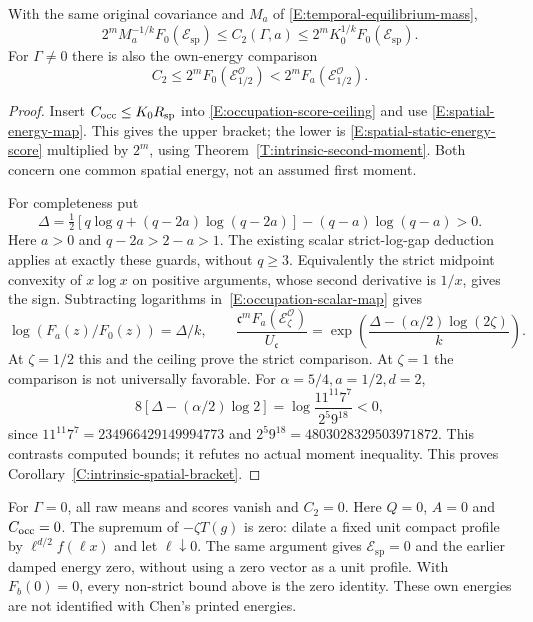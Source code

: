 \begin{corollary}
  \label{C:intrinsic-spatial-bracket}
  With the same original covariance and $M_a$ of
  \eqref{E:temporal-equilibrium-mass},
  \begin{equation}\label{E:intrinsic-spatial-bracket}
    2^m M_a^{-1/k}F_0(\mathcal E_{\mathrm{sp}})
    \le C_2(\Gamma,a)
    \le2^m K_0^{1/k}F_0(\mathcal E_{\mathrm{sp}}).
  \end{equation}
  For $\Gamma\ne0$ there is also the own-energy comparison
  \[
    C_2\le2^mF_0(\mathcal E_{1/2}^{\mathcal O})
    <2^mF_a(\mathcal E_{1/2}^{\mathcal O}).
  \]
\end{corollary}

\begin{proof}
  Insert $C_{\rm occ}\le K_0R_{\mathrm{sp}}$ into
  \eqref{E:occupation-score-ceiling} and use
  \eqref{E:spatial-energy-map}.
  This gives the upper bracket; the lower is
  \eqref{E:spatial-static-energy-score} multiplied by $2^m$,
  using Theorem~\ref{T:intrinsic-second-moment}.
  Both concern one common spatial energy, not an assumed first moment.

  For completeness put
  \[
    \Delta=\tfrac12[q\log q+(q-2a)\log(q-2a)]
    -(q-a)\log(q-a)>0.
  \]
  Here $a>0$ and $q-2a>2-a>1$.
  The existing scalar strict-log-gap deduction applies at exactly
  these guards, without $q\ge3$.
  Equivalently the strict midpoint convexity of $x\log x$ on
  positive arguments, whose second derivative is $1/x$, gives the sign.
  Subtracting logarithms in~\eqref{E:occupation-scalar-map} gives
  \[
    \log(F_a(z)/F_0(z))=\Delta/k,\qquad
    \frac{\mathfrak c^mF_a(\mathcal E_\zeta^{\mathcal O})}{U_{\mathfrak c}}
    =\exp\!\left(\frac{\Delta-(\alpha/2)\log(2\zeta)}{k}\right).
  \]
  At $\zeta=1/2$ this and the ceiling prove the strict comparison.
  At $\zeta=1$ the comparison is not universally favorable.
  For $\alpha=5/4,a=1/2,d=2$,
  \[
    8[\Delta-(\alpha/2)\log2]
    =\log\frac{11^{11}7^7}{2^5 9^{18}}<0,
  \]
  since $11^{11}7^7=234966429149994773$ and
  $2^5 9^{18}=4803028329503971872$.
  This contrasts computed bounds; it refutes no actual moment inequality.
  This proves Corollary~\ref{C:intrinsic-spatial-bracket}.
\end{proof}

For $\Gamma=0$, all raw means and scores vanish and $C_2=0$.
Here $Q=0$, $A=0$ and $C_{\rm occ}=0$.
The supremum of $-\zeta T(g)$ is zero: dilate a fixed unit compact
profile by $\ell^{d/2}f(\ell x)$ and let $\ell\downarrow0$.
The same argument gives $\mathcal E_{\mathrm{sp}}=0$ and the earlier
damped energy zero, without using a zero vector as a unit profile.
With $F_b(0)=0$, every non-strict bound above is the zero identity.
These own energies are not identified with Chen's printed energies.
